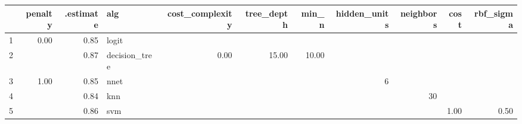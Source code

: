 \begin{table}[ht]
\centering
\begin{tabular}{rrrlrrrrrrr}
  \hline
 & penalty & .estimate & alg & cost\_complexity & tree\_depth & min\_n & hidden\_units & neighbors & cost & rbf\_sigma \\ 
  \hline
1 & 0.00 & 0.85 & logit &  &  &  &  &  &  &  \\ 
  2 &  & 0.87 & decision\_tree & 0.00 & 15.00 & 10.00 &  &  &  &  \\ 
  3 & 1.00 & 0.85 & nnet &  &  &  &   6 &  &  &  \\ 
  4 &  & 0.84 & knn &  &  &  &  &  30 &  &  \\ 
  5 &  & 0.86 & svm &  &  &  &  &  & 1.00 & 0.50 \\ 
   \hline
\end{tabular}
\end{table}
